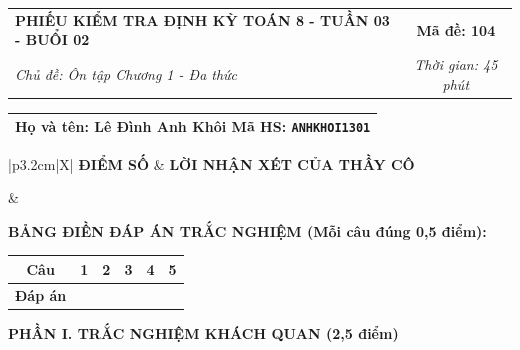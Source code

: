 \documentclass[12pt,a4paper]{article}
\begin{document}
\newpage


\noindent
\begin{tabularx}{\linewidth}{|X|c|}
\hline
\textbf{PHIẾU KIỂM TRA ĐỊNH KỲ TOÁN 8 - TUẦN 03 - BUỔI 02} & \textbf{Mã đề: 104} \\
\textit{Chủ đề: Ôn tập Chương 1 - Đa thức} & \textit{Thời gian: 45 phút} \\
\hline
\end{tabularx}

\vspace{1mm}

\noindent
\begin{tabularx}{\linewidth}{|X|}
\hline
\rule[-2mm]{0pt}{7.5mm}\textbf{Họ và tên:} \textbf{\large Lê Đình Anh Khôi} \hfill \textbf{Mã HS:} \texttt{ANHKHOI1301} \quad \\
\hline
\end{tabularx}

\vspace{1mm}

\noindent
\begin{tabularx}{\linewidth}{|p{3.2cm}|X|}
\hline
\centering\textbf{ĐIỂM SỐ} & \centering\textbf{LỜI NHẬN XÉT CỦA THẦY CÔ} \tabularnewline
\hline
\rule{0pt}{1.3cm} & \tabularnewline
\hline
\end{tabularx}

\vspace{1.2mm}

\noindent\textbf{BẢNG ĐIỀN ĐÁP ÁN TRẮC NGHIỆM (Mỗi câu đúng 0,5 điểm):}
\vspace{0.8mm}

\noindent
\renewcommand{\arraystretch}{1.35}
\begin{tabularx}{\linewidth}{|c|*{5}{>{\centering\arraybackslash}X|}}
\hline
\textbf{Câu} & \textbf{1} & \textbf{2} & \textbf{3} & \textbf{4} & \textbf{5} \\
\hline
\textbf{Đáp án} & & & & & \\
\hline
\end{tabularx}
\renewcommand{\arraystretch}{1.0}

\vspace{1.5mm}

\noindent\textbf{\large PHẦN I. TRẮC NGHIỆM KHÁCH QUAN (2,5 điểm)}
\vspace{1mm}
\end{document}
